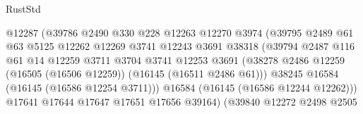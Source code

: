 \begin{lexlean}{RustStd}
\begin{coremodule}
                                        @12287
                                        (@39786
                                          @2490
                                          @330
                                          @228
                                          @12263
                                          @12270
                                          @3974
                                          (@39795
                                            @2489
                                            @61
                                            @63
                                            @5125
                                            @12262
                                            @12269
                                            @3741
                                            @12243
                                            @3691
                                            @38318
                                            (@39794
                                              @2487
                                              @116
                                              @61
                                              @14
                                              @12259
                                              @3711
                                              @3704
                                              @3741
                                              @12253
                                              @3691
                                              (@38278
                                                @2486
                                                @12259
                                                (@16505 (@16506 @12259))
                                                (@16145 (@16511 @2486 @61)))
                                              @38245
                                              @16584
                                              (@16145 (@16586 @12254 @3711)))
                                            @16584
                                            (@16145 (@16586 @12244 @12262)))
                                          @17641
                                          @17644
                                          @17647
                                          @17651
                                          @17656
                                          @39164)
                                        (@39840
                                          @12272
                                          @2498
                                          @2505

\end{coremodule}
\end{lexlean}
